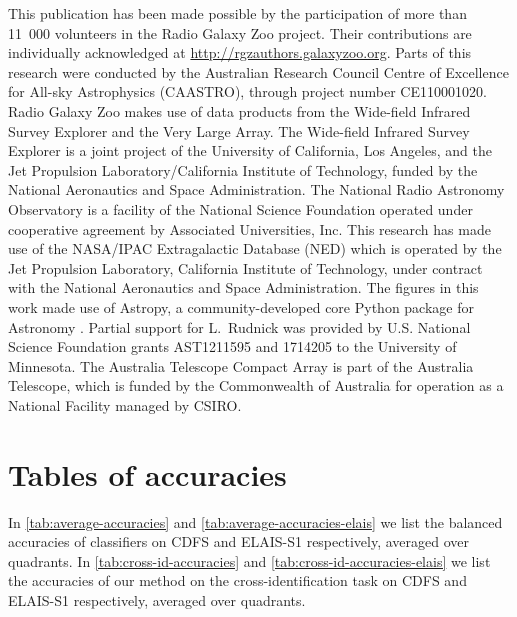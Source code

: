 \documentclass[fleqn,usenatbib,usedcolumn]{mnras}
\begin{document}
  This publication has been made possible by the participation of more than
  11~000 volunteers in the Radio Galaxy Zoo project. Their contributions are
  individually acknowledged at \url{http://rgzauthors.galaxyzoo.org}. Parts of
  this research were conducted by the Australian Research Council Centre of
  Excellence for All-sky Astrophysics (CAASTRO), through project number
  CE110001020. Radio Galaxy Zoo makes use of data products from the Wide-field
  Infrared Survey Explorer and the Very Large Array. The Wide-field Infrared
  Survey Explorer is a joint project of the University of California, Los
  Angeles, and the Jet Propulsion Laboratory/California Institute of
  Technology, funded by the National Aeronautics and Space Administration. The
  National Radio Astronomy Observatory is a facility of the National Science
  Foundation operated under cooperative agreement by Associated Universities,
  Inc. This research has made use of the NASA/IPAC Extragalactic Database
  (NED) which is operated by the Jet Propulsion Laboratory, California
  Institute of Technology, under contract with the National Aeronautics and
  Space Administration. The figures in this work made use of Astropy, a
  community-developed core Python package for Astronomy \citep{astropy}.
  Partial support for L.~Rudnick was provided by U.S. National Science
  Foundation grants AST1211595 and 1714205 to the University of Minnesota. The
  Australia Telescope Compact Array is part of the Australia Telescope, which
  is funded by the Commonwealth of Australia for operation as a National
  Facility managed by CSIRO.

%



\clearpage
\appendix
\section{Tables of accuracies}

In \autoref{tab:average-accuracies} and \autoref{tab:average-accuracies-elais}
we list the balanced accuracies of classifiers on CDFS and ELAIS-S1
respectively, averaged over quadrants. In \autoref{tab:cross-id-accuracies}
and \autoref{tab:cross-id-accuracies-elais} we list the accuracies of our
method on the cross-identification task on CDFS and ELAIS-S1 respectively,
averaged over quadrants.
\end{document}
